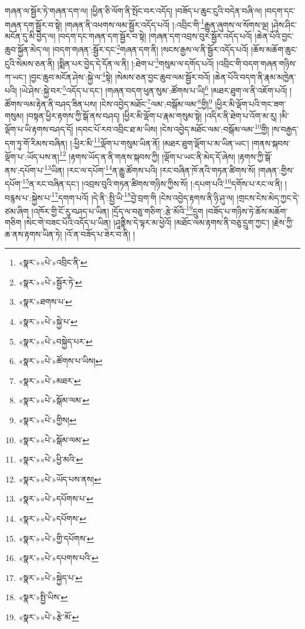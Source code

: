 གཞན་ལ་སྦྱོར་ཏེ་གཞན་དག་ལ། །ཕྱིན་ཅི་ལོག་ནི་སྤོང་བར་འདོད། །བཟོད་པ་ཆུང་ངུའི་བདེན་བཞི་ལ། །བདག་དང་གཞན་དག་སྦྱོར་བ་སྟེ། །གཞན་ནི་འཕགས་ལམ་སྦྱོར་འདོད་པའོ། །:འབྲིང་གི་\footnote{«སྣར་»«པེ་»འབྲིང་ནི་}རྒྱུན་ཞུགས་ལ་སོགས་ལྔ། །ཤེས་ཤིང་མངོན་དུ་མི་བྱེད་ལ། །བདག་དང་གཞན་དག་སྦྱོར་བ་སྟེ། །གཞན་དག་འབྲས་བུར་སྦྱོར་འདོད་པའོ། །ཆེན་པོའི་བྱང་ཆུབ་སྐྱོན་མེད་ལ། །བདག་གཞན་:སྦྱོར་དང་\footnote{«སྣར་»«པེ་»སྦྱོར་ཏེ་}གཞན་དག་ནི། །སངས་རྒྱས་ལ་ནི་སྦྱོར་འདོད་པའོ། །ཆོས་མཆོག་ཆུང་ངུའི་སེམས་ཅན་ནི། །སྨིན་པར་བྱེད་དེ་དོན་ལ་ནི། །:ཐེག་པ་\footnote{«སྣར་»ཐགས་པ་}གསུམ་ལ་དགོད་པའོ། །འབྲིང་གི་བདག་གཞན་གཉིས་ཀ་ཡང་། །བྱང་ཆུབ་མངོན་ཤེས་:སྐྱེ་ལ་\footnote{«སྣར་»«པེ་»སྐྱེ་པ་}སྟེ། །སེམས་ཅན་བྱང་ཆུབ་ལམ་སྦྱོར་བའོ། །ཆེན་པོའི་བདག་ནི་རྣམ་མཁྱེན་པའི། །ཡེ་ཤེས་:སྐྱེ་བར་\footnote{«སྣར་»«པེ་»བསྐྱེད་པར་}འདོད་པ་དང་། །གཞན་བདག་ཕུན་སུམ་:ཚོགས་པ་ཡི།\footnote{«སྣར་»«པེ་»ཚོགས་པ་ཡིས།} །མཐར་ཐུག་ལ་ནི་འཇོག་པའོ། །ཚོགས་ལམ་རྟེན་ནི་བཤད་ཟིན་པས། །ངེས་འབྱེད་མཐོང་\footnote{«སྣར་»«པེ་»མཐར་}ལམ་:བསྒོམ་ལམ་\footnote{«སྣར་»«པེ་»སྒོམ་ལམ་}གྱི།\footnote{«སྣར་»«པེ་»གྱིས།} །ཕྱིར་མི་ལྡོག་པའི་གང་ཟག་གསུམ། །བསྟན་ཕྱིར་རྟགས་ཀྱི་སྒོ་ནས་བཤད། །ཕྱིར་མི་ལྡོག་པ་རྣམ་གསུམ་སྟེ། །འདིར་ནི་ཐེག་པ་འོག་མ་རུ། །མི་ལྡོག་པ་ཡི་རྟགས་བཤད་དོ། །དབང་པོ་རབ་འབྲིང་ཐ་མ་ཡིས། །ངེས་འབྱེད་མཐོང་ལམ་:བསྒོམ་ལམ་\footnote{«སྣར་»«པེ་»སྒོམ་ལམ་}གྱི། །ས་བརྒྱད་དག་ཏུ་གོ་རིམས་བཞིན། །:ཕྱིར་མི་\footnote{«སྣར་»«པེ་»ཕྱི་མའི་}ལྡོག་པ་གསུམ་ཡིན་ནོ། །མཐར་ཐུག་ལྡོག་པ་མ་ཡིན་ཡང་། །གནས་སྐབས་ལྡོག་པ་:ཡོད་པས་ན།\footnote{«སྣར་»«པེ་»ཡོད་པས་ནས།} །རྟགས་ཡོད་ན་ནི་གནས་སྐབས་ཀྱི། །ལྡོག་པ་ཡང་ནི་མེད་དོ་ཞེས། །རྟགས་ཀྱི་སྒོ་ནས་:དཔོག་པ་\footnote{«སྣར་»«པེ་»དཔོགས་པ་}ཡིན། །རང་ལ་དཔོག་\footnote{«སྣར་»«པེ་»དཔོགས་}ན་རྒྱུ་ཚོགས་པའི། །རང་བཞིན་ཁོ་ནའི་གཏན་ཚིགས་སོ། །གཞན་:གྱིས་དཔོག་\footnote{«སྣར་»«པེ་»གྱི་དཔོགས་}ན་རང་བཞིན་དང་། །འབྲས་བུའི་གཏན་ཚིགས་གཉིས་ཀྱིས་སོ། །:དཔག་པའི་\footnote{«སྣར་»«པེ་»དཔགས་པའི་}དགོས་པ་རང་ལ་ནི། །བརྙས་པ་:སྐྱེས་པ་\footnote{«སྣར་»«པེ་»སྐྱེད་པ་}དགག་པའོ། །དེ་ནི་:སྤྱི་ཡི་\footnote{«སྣར་»སྤྱི་ཡིས་}བྱེ་བྲག་གི །ངེས་འབྱེད་རྟགས་ནི་ཉི་ཤུ་ལ། །གྲངས་ངེས་མེད་ཀྱང་དེ་ཙམ་ཞིག །འཁོར་གྱི་ངོ་རུ་བཤད་པ་ཡིན། །དྲོད་ལ་བཅུ་གཅིག་:རྩེ་མོའི་\footnote{«སྣར་»«པེ་»རྩེ་མོ་}དྲུག །བཟོད་པ་གཉིས་ཏེ་ཆོས་མཆོག་གཅིག །སེང་གེ་བཟང་པོའི་འདོད་པ་ཡིན། །ཤཱནྟིས་དེ་ལྟར་མ་ཕྱེའོ། །མཐོང་ལམ་རྟགས་ནི་བཅུ་དྲུག་ཀྱང་། །རྗེས་ཀྱི་ཆ་ནས་རྟགས་ཡིན་ཏེ། །འོ་ན་བཟོད་པ་ཟེར་བ་ནི། །
